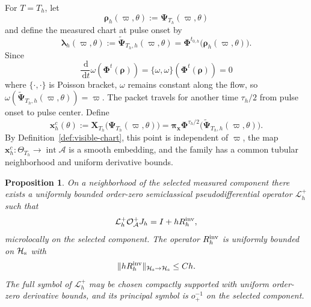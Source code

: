 \documentclass[11pt,reqno]{amsart}
\newtheorem{proposition}{Proposition}[section]
\newcommand{\dd}{\,\mathrm{d}}
\numberwithin{equation}{section}
\begin{document}
For $T=T_h$, let
\begin{equation*}
    \bm{\rho}_h(\varpi,\theta):=\bm\Psi_{T_h}(\varpi,\theta)
\end{equation*}
and define the measured chart at pulse onset by
\begin{equation*}
    \bm\lambda_h(\varpi,\theta):=\widetilde{\bm\Psi}_{T_h,h}(\varpi,\theta)=\bm\Phi^{t_{0,h}}\bigl(\bm{\rho}_h(\varpi,\theta)\bigr).
\end{equation*}
Since
$$
    \frac{\dd}{\dd t}\omega(\bm{\Phi}^t(\bm{\rho})) = \{\omega,\omega\}(\bm{\Phi}^t(\bm{\rho})) = 0
$$
where $\{\cdot,\cdot\}$ is Poisson bracket, $\omega$ remains constant along the flow, so $\omega(\widetilde{\bm\Psi}_{T_h,h}(\varpi,\theta))=\varpi$. The packet travels for another time $\tau_h/2$ from pulse onset to pulse center. Define
\begin{equation*}
    \bm{x}_h^c(\theta):=\bm X_{T_h}\bigl(\bm\Psi_{T_h}(\varpi,\theta)\bigr)=\bm\pi_{\bm{x}}\bm\Phi^{\tau_h/2}\bigl(\widetilde{\bm\Psi}_{T_h,h}(\varpi,\theta)\bigr).
\end{equation*}
By Definition~\ref{def:visible-chart}, this point is independent of $\varpi$, the map $\bm{x}_h^c:\Theta_{T_h}\to\operatorname{int}\mathcal A$ is a smooth embedding, and the family has a common tubular neighborhood and uniform derivative bounds.

\begin{proposition}\label{prop:inverse-oa}
On a neighborhood of the selected measured component there exists a uniformly bounded order-zero semiclassical pseudodifferential operator $\mathcal L_h^+$ such that
\begin{equation}\label{eq:observation-inverse}
    \mathcal L_h^+\mathcal O_{\mathcal A}^+J_h
    = I+hR_h^{\rm inv},
\end{equation}
microlocally on the selected component. The operator $R_h^{\rm inv}$ is uniformly bounded on $\mathcal H_{\rm s}$ with
\begin{equation*}
 \|hR_h^{\rm inv}\|_{\mathcal H_{\rm s}\to\mathcal H_{\rm s}}\le Ch.
\end{equation*}
The full symbol of $\mathcal L_h^+$ may be chosen compactly supported with uniform order-zero derivative bounds, and its principal symbol is $o_+^{-1}$ on the selected component.
\end{proposition}
\end{document}
